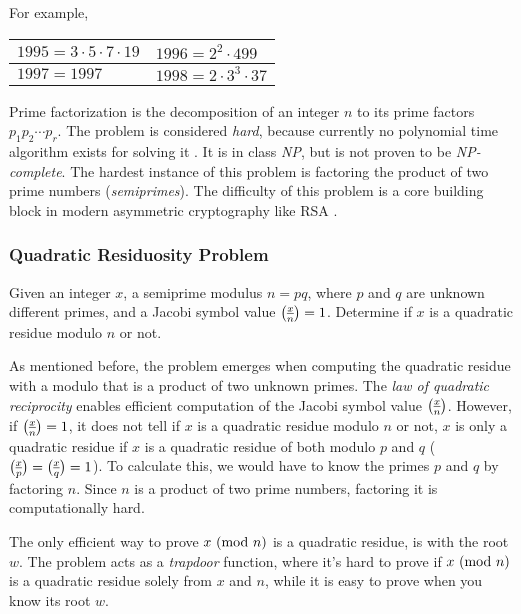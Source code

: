 For example,

\begin{center}
	\begin{tabular}{|l|l|}
		\hline
		$1995 = 3 \cdot 5 \cdot 7 \cdot 19$ & 
		$1996 = 2^2 \cdot 499$ \\
		\hline
		$1997 = 1997$ &
		$1998 = 2 \cdot 3^3 \cdot 37$\\
		\hline
	\end{tabular}
\end{center}


Prime factorization is the decomposition of an integer $n$ to its prime factors $p_1 p_2 \cdots p_r$.
The problem is considered \textit{hard}, because currently no polynomial time algorithm exists for solving it \cite{Buchmann2001}. It is in class \textit{NP}, but is not proven to be \textit{NP-complete}.
The hardest instance of this problem is factoring the product of two prime numbers (\textit{semiprimes}).
The difficulty of this problem is a core building block in modern asymmetric cryptography like RSA \cite{rivest1978method}.

\subsubsection{Quadratic Residuosity Problem}

\begin{definition}
	Given an integer $x$, a semiprime modulus $n = pq$, where $p$ and $q$ are unknown different primes, and a Jacobi symbol value $\legendre{x}{n} = 1$.
Determine if $x$ is a quadratic residue modulo $n$ or not.
\end{definition}

As mentioned before, the problem emerges when computing the quadratic residue with a modulo that is a product of two unknown primes.
The \textit{law of quadratic reciprocity} enables efficient computation of the Jacobi symbol value $\legendre{x}{n}$.
However, if $\legendre{x}{n} = 1$, it does not tell if $x$ is a quadratic residue modulo $n$ or not, $x$ is only a quadratic residue if $x$ is a quadratic residue of both modulo $p$ and $q$ ($\legendre{x}{p} = \legendre{x}{q} = 1$).
To calculate this, we would have to know the primes $p$ and $q$ by factoring $n$.
Since $n$ is a product of two prime numbers, factoring it is computationally hard.

The only efficient way to prove $x \ (\mathrm{mod}\ n)$ is a quadratic residue, is with the root $w$.
The problem acts as a \textit{trapdoor} function, where it's hard to prove if $x \ (\mathrm{mod}\ n)$ is a quadratic residue solely from $x$ and $n$, while it is easy to prove when you know its root $w$.

